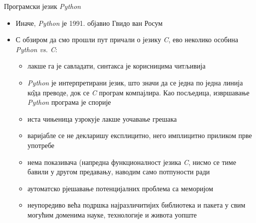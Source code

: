 \documentclass{beamer}
\begin{document}
\begin{frame}{Програмски језик \textit{Python}}
\begin{itemize}
    \item Иначе, \textit{Python} је 1991. објавио Гвидо ван Росум
    \item С обзиром да смо прошли пут причали о језику \textit{C}, ево неколико особина \textit{Python vs. C}:
    \begin{itemize}
        \item лакше га је савладати, синтакса је корисницима читљивија
        \item \textit{Python} је интерпретирани језик, што значи да се једна по једна линија к\^{о}да преводе, док се \textit{C} програм компајлира. Као посљедица, извршавање \textit{Python} програма је спорије
        \item иста чињеница узрокује лакше уочавање грешака
        \item варијабле се не декларишу експлицитно, него имплицитно приликом прве употребе
        \item нема показивача (напредна функционалност језика \textit{C}, нисмо се тиме бавили у другом предавању, наводим само потпуности ради
        \item аутоматско рјешавање потенцијалних проблема са меморијом
        \item неупоредиво већа подршка најразличитијих библиотека и пакета у свим могућим доменима науке, технологије и живота уопште
    \end{itemize}
\end{itemize}
\end{frame}
\end{document}

